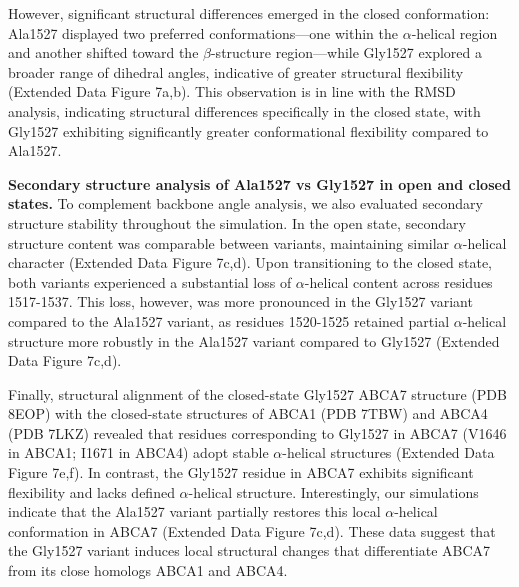 However, significant structural differences emerged in the closed conformation: Ala1527 displayed two preferred conformations—one within the $\alpha$-helical region and another shifted toward the $\beta$-structure region—while Gly1527 explored a broader range of dihedral angles, indicative of greater structural flexibility (Extended Data Figure 7a,b). This observation is in line with the RMSD analysis, indicating structural differences specifically in the closed state, with Gly1527 exhibiting significantly greater conformational flexibility compared to Ala1527.

\textbf{Secondary structure analysis of Ala1527 vs Gly1527 in open and closed states.}\newline
To complement backbone angle analysis, we also evaluated secondary structure stability throughout the simulation. In the open state, secondary structure content was comparable between variants, maintaining similar $\alpha$-helical character (Extended Data Figure 7c,d). Upon transitioning to the closed state, both variants experienced a substantial loss of $\alpha$-helical content across residues 1517-1537. This loss, however, was more pronounced in the Gly1527 variant compared to the Ala1527 variant, as residues 1520-1525 retained partial $\alpha$-helical structure more robustly in the Ala1527 variant compared to Gly1527 (Extended Data Figure 7c,d).

Finally, structural alignment of the closed-state Gly1527 ABCA7 structure (PDB 8EOP) with the closed-state structures of ABCA1 (PDB 7TBW) and ABCA4 (PDB 7LKZ) revealed that residues corresponding to Gly1527 in ABCA7 (V1646 in ABCA1; I1671 in ABCA4) adopt stable $\alpha$-helical structures (Extended Data Figure 7e,f). In contrast, the Gly1527 residue in ABCA7 exhibits significant flexibility and lacks defined $\alpha$-helical structure. Interestingly, our simulations indicate that the Ala1527 variant partially restores this local $\alpha$-helical conformation in ABCA7 (Extended Data Figure 7c,d). These data suggest that the Gly1527 variant induces local structural changes that differentiate ABCA7 from its close homologs ABCA1 and ABCA4.
